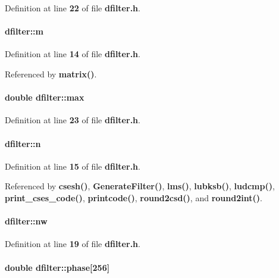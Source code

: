 Definition at line {\bf 22} of file {\bf dfilter.\+h}.

\paragraph[{m}]{ dfilter\+::m}\label{structdfilter_ae2db6349b0c0a987e256e612d4f2e767}


Definition at line {\bf 14} of file {\bf dfilter.\+h}.



Referenced by {\bf matrix()}.

\paragraph[{max}]{\setlength{\rightskip}{0pt plus 5cm}double dfilter\+::max}\label{structdfilter_a1a9f94d549cd6b9d8d4d833c199cbd57}


Definition at line {\bf 23} of file {\bf dfilter.\+h}.

\paragraph[{n}]{ dfilter\+::n}\label{structdfilter_ac0f987553e54f4ce7f6e300d2fc8be9f}


Definition at line {\bf 15} of file {\bf dfilter.\+h}.



Referenced by {\bf csesh()}, {\bf Generate\+Filter()}, {\bf lms()}, {\bf lubksb()}, {\bf ludcmp()}, {\bf print\+\_\+cses\+\_\+code()}, {\bf printcode()}, {\bf round2csd()}, and {\bf round2int()}.

\paragraph[{nw}]{ dfilter\+::nw}\label{structdfilter_ae82b49eaa728585528067a4346c14a24}


Definition at line {\bf 19} of file {\bf dfilter.\+h}.

\paragraph[{phase}]{\setlength{\rightskip}{0pt plus 5cm}double dfilter\+::phase[256]}\label{structdfilter_a6f16b955112d5ee83522275b6f282fce}


